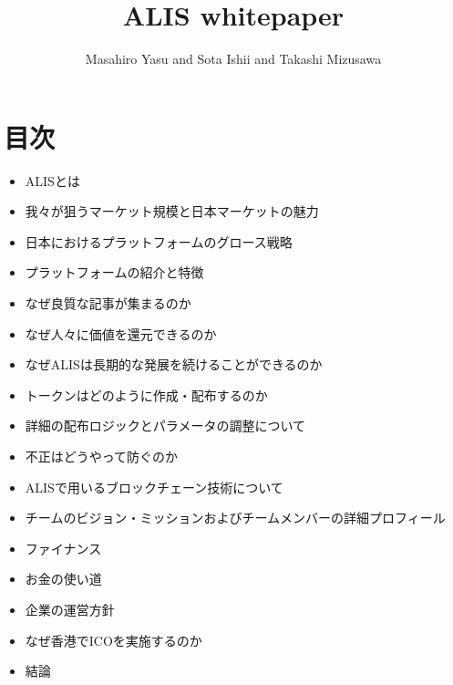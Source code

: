 \documentclass{jsarticle}
\begin{document}
\title{ALIS whitepaper}
\author{Masahiro Yasu and Sota Ishii and Takashi Mizusawa}
\maketitle

\section{目次}
\begin{itemize}
	\item ALISとは
	\item 我々が狙うマーケット規模と日本マーケットの魅力
	\item 日本におけるプラットフォームのグロース戦略
	\item プラットフォームの紹介と特徴
	\item なぜ良質な記事が集まるのか
	\item なぜ人々に価値を還元できるのか
	\item なぜALISは長期的な発展を続けることができるのか
	\item トークンはどのように作成・配布するのか
	\item 詳細の配布ロジックとパラメータの調整について
	\item 不正はどうやって防ぐのか
	\item ALISで用いるブロックチェーン技術について
	\item チームのビジョン・ミッションおよびチームメンバーの詳細プロフィール
	\item ファイナンス
	\item お金の使い道
	\item 企業の運営方針
	\item なぜ香港でICOを実施するのか
	\item 結論
\end{itemize}
\end{document}
